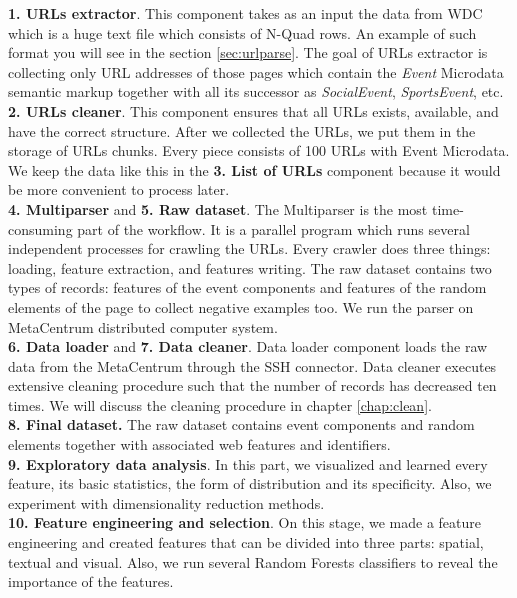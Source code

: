 \textbf{1. URLs extractor}. This component takes as an input the data from WDC which is a huge text file which consists of N-Quad rows. An example of such format you will see in the section \ref{sec:urlparse}. The goal of URLs extractor is collecting only URL addresses of those pages which contain the \textit{Event} Microdata semantic markup together with all its successor as \textit{SocialEvent}, \textit{SportsEvent}, etc.\\

\textbf{2. URLs cleaner}. This component ensures that all URLs exists, available, and have the correct structure. After we collected the URLs, we put them in the storage of URLs chunks. Every piece consists of 100 URLs with Event Microdata. We keep the data like this in the \textbf{3. List of URLs} component because it would be more convenient to process later.\\

\textbf{4. Multiparser} and \textbf{5. Raw dataset}. The Multiparser is the most time-consuming part of the workflow. It is a parallel program which runs several independent processes for crawling the URLs. Every crawler does three things: loading, feature extraction, and features writing. The raw dataset contains two types of records: features of the event components and features of the random elements of the page to collect negative examples too. We run the parser on MetaCentrum distributed computer system.\\

\textbf{6. Data loader} and \textbf{7. Data cleaner}. Data loader component loads the raw data from the MetaCentrum through the SSH connector.  Data cleaner executes extensive cleaning procedure such that the number of records has decreased ten times. We will discuss the cleaning procedure in chapter \ref{chap:clean}.\\

\textbf{8. Final dataset.} The raw dataset contains event components and random elements together with associated web features and identifiers.\\

\textbf{9. Exploratory data analysis}. In this part, we visualized and learned every feature, its basic statistics, the form of distribution and its specificity. Also, we experiment with dimensionality reduction methods.  \\

\textbf{10. Feature engineering and selection}. On this stage, we made a feature engineering and created features that can be divided into three parts: spatial, textual and visual. Also, we run several Random Forests classifiers to reveal the importance of the features.\\

